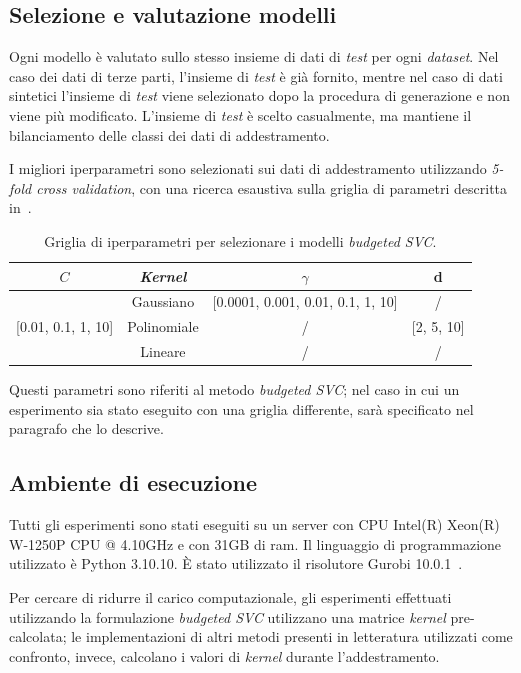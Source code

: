 \subsection{Selezione e valutazione modelli}
Ogni modello è valutato sullo stesso insieme di dati di \emph{test} per ogni \emph{dataset}.
Nel caso dei dati di terze parti, l'insieme di \emph{test} è già fornito, mentre nel caso di dati sintetici l'insieme di \emph{test} viene selezionato dopo la procedura di generazione e non viene più modificato.
L'insieme di \emph{test} è scelto casualmente, ma mantiene il bilanciamento delle classi dei dati di addestramento.

I migliori iperparametri sono selezionati sui dati di addestramento utilizzando \emph{5-fold cross validation}, con una ricerca esaustiva sulla griglia di parametri descritta in~.
\begin{table}
    \centering
    \begin{tabular}{cccc}
        \toprule
        $C$ & \emph{Kernel} & $\gamma$ & d \\
        \midrule
        \multirow{3}{*}{[0.01, 0.1, 1, 10]} & Gaussiano   & [0.0001, 0.001, 0.01, 0.1, 1, 10]   & /\\
                                            \cline{2-4}
                                            & Polinomiale   & / & [2, 5, 10] \\
                                            \cline{2-4}
                                            & Lineare       & / & / \\
        \bottomrule
    \end{tabular}
    \caption{Griglia di iperparametri per selezionare i modelli \emph{budgeted SVC}.}
    \label{tab:gridsearch_2d}
\end{table}
Questi parametri sono riferiti al metodo \emph{budgeted SVC}; nel caso in cui un esperimento sia stato eseguito con una griglia differente, sarà specificato nel paragrafo che lo descrive.

\subsection{Ambiente di esecuzione}
Tutti gli esperimenti sono stati eseguiti su un server con CPU Intel(R) Xeon(R) W-1250P CPU @ 4.10GHz e con 31GB di ram. Il linguaggio di programmazione utilizzato è Python 3.10.10. \`E stato utilizzato il risolutore Gurobi 10.0.1~\cite{gurobi}. 

Per cercare di ridurre il carico computazionale, gli esperimenti effettuati utilizzando la formulazione \emph{budgeted SVC} utilizzano una matrice \emph{kernel} pre-calcolata; le implementazioni di altri metodi presenti in letteratura utilizzati come confronto, invece, calcolano i valori di \emph{kernel} durante l'addestramento.

